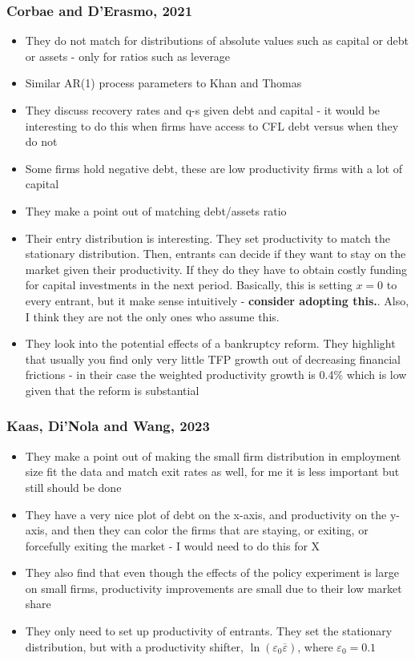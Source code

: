 \documentclass[12pt]{article}
\begin{document}
\subsubsection*{Corbae and D'Erasmo, 2021 \checkmark}
\begin{itemize}\setlength\itemsep{0em} \small
    \item They do not match for distributions of absolute values such as capital or debt or assets - only for ratios such as leverage
    \item Similar AR(1) process parameters to Khan and Thomas
    \item They discuss recovery rates and q-s given debt and capital - it would be interesting to do this when firms have access to CFL debt versus when they do not
    \item Some firms hold negative debt, these are low productivity firms with a lot of capital
    \item They make a point out of matching debt/assets ratio
    \item Their entry distribution is interesting. They set productivity to match the stationary distribution. Then, entrants can decide if they want to stay on the market given their productivity. If they do they have to obtain costly funding for capital investments in the next period. Basically, this is setting $x=0$ to every entrant, but it make sense intuitively - \textbf{consider adopting this.}. Also, I think they are not the only ones who assume this.
    \item They look into the potential effects of a bankruptcy reform. They highlight that usually you find only very little TFP growth out of decreasing financial frictions - in their case the weighted productivity growth is 0.4\% which is low given that the reform is substantial
\end{itemize} \normalsize

\subsubsection*{Kaas, Di'Nola and Wang, 2023}
\begin{itemize}\setlength\itemsep{0em} \small
    \item They make a point out of making the small firm distribution in employment size fit the data and match exit rates as well, for me it is less important but still should be done
    \item They have a very nice plot of debt on the x-axis, and productivity on the y-axis, and then they can color the firms that are staying, or exiting, or forcefully exiting the market - I would need to do this for X
    \item They also find that even though the effects of the policy experiment is large on small firms, productivity improvements are small due to their low market share
    \item They only need to set up productivity of entrants. They set the stationary distribution, but with a productivity shifter, $\ln(\varepsilon_0\overline{\varepsilon})$, where $\varepsilon_0 = 0.1$
\end{itemize} \normalsize
\end{document}
